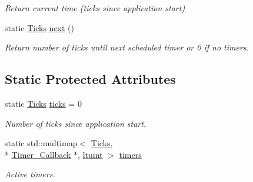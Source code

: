 \begin{DoxyCompactItemize}
\begin{DoxyCompactList}\small\item\em Return current time (ticks since application start) \end{DoxyCompactList}\item 
\hypertarget{classGUI_1_1Timer_a44e2f3e6123c9513b87b81f244ef9311}{static \hyperlink{namespaceGUI_af396fee5d5c26b98218f5803f85e3b65}{Ticks} \hyperlink{classGUI_1_1Timer_a44e2f3e6123c9513b87b81f244ef9311}{next} ()}\label{classGUI_1_1Timer_a44e2f3e6123c9513b87b81f244ef9311}

\begin{DoxyCompactList}\small\item\em Return number of ticks until next scheduled timer or 0 if no timers. \end{DoxyCompactList}\end{DoxyCompactItemize}
\subsection*{Static Protected Attributes}
\begin{DoxyCompactItemize}
\item 
\hypertarget{classGUI_1_1Timer_a619f8c17a217a4524de5ba0e2562870e}{static \hyperlink{namespaceGUI_af396fee5d5c26b98218f5803f85e3b65}{Ticks} \hyperlink{classGUI_1_1Timer_a619f8c17a217a4524de5ba0e2562870e}{ticks} = 0}\label{classGUI_1_1Timer_a619f8c17a217a4524de5ba0e2562870e}

\begin{DoxyCompactList}\small\item\em Number of ticks since application start. \end{DoxyCompactList}\item 
\hypertarget{classGUI_1_1Timer_a09c091f0975773995b0a62228d734c21}{static std\-::multimap$<$ \hyperlink{namespaceGUI_af396fee5d5c26b98218f5803f85e3b65}{Ticks}, \\*
\hyperlink{structGUI_1_1Timer__Callback}{Timer\-\_\-\-Callback} $\ast$, \hyperlink{structGUI_1_1Timer_1_1ltuint}{ltuint} $>$ \hyperlink{classGUI_1_1Timer_a09c091f0975773995b0a62228d734c21}{timers}}\label{classGUI_1_1Timer_a09c091f0975773995b0a62228d734c21}

\begin{DoxyCompactList}\small\item\em Active timers. \end{DoxyCompactList}\end{DoxyCompactItemize}



